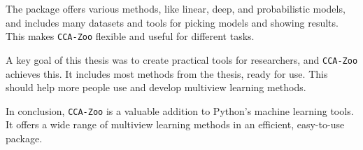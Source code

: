 The package offers various methods, like linear, deep, and probabilistic models, and includes many datasets and tools for picking models and showing results.
This makes \texttt{CCA-Zoo} flexible and useful for different tasks.

A key goal of this thesis was to create practical tools for researchers, and \texttt{CCA-Zoo} achieves this.
It includes most methods from the thesis, ready for use.
This should help more people use and develop multiview learning methods.

In conclusion, \texttt{CCA-Zoo} is a valuable addition to Python's machine learning tools.
It offers a wide range of multiview learning methods in an efficient, easy-to-use package.
